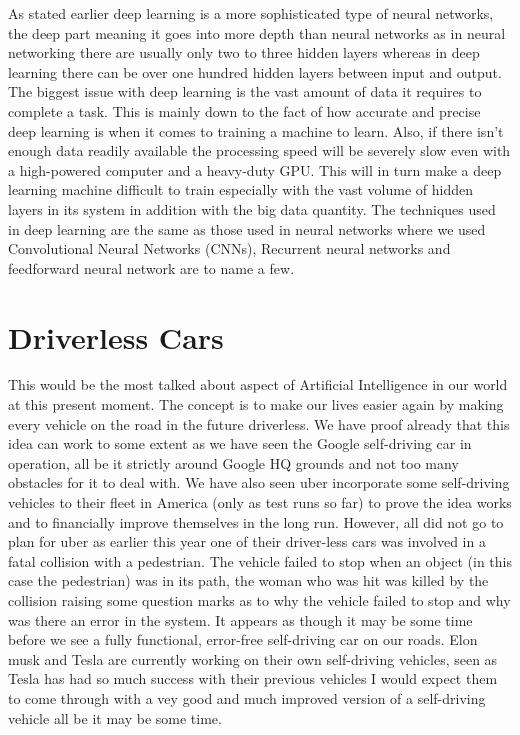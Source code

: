 \documentclass[letterpaper, 10 pt, conference]{ieeeconf}  %
\begin{document}
As stated earlier deep learning is a more sophisticated type of neural networks, the deep part meaning it goes into more depth than neural networks as in neural networking there are usually only two to three hidden layers whereas in deep learning there can be over one hundred hidden layers between input and output. 
The biggest issue with deep learning is the vast amount of data it requires to complete a task. This is mainly down to the fact of how accurate and precise deep learning is when it comes to training a machine to learn. Also, if there isn’t enough data readily available the processing speed will be severely slow even with a high-powered computer and a heavy-duty GPU. This will in turn make a deep learning machine difficult to train especially with the vast volume of hidden layers in its system in addition with the big data quantity. The techniques used in deep learning are the same as those used in neural networks where we used Convolutional Neural Networks (CNNs), Recurrent neural networks and feedforward neural network are to name a few. 


\section{Driverless Cars}
This would be the most talked about aspect of Artificial Intelligence in our world at this present moment. The concept is to make our lives easier again by making every vehicle on the road in the future driverless. We have proof already that this idea can work to some extent as we have seen the Google self-driving car in operation, all be it strictly around Google HQ grounds and not too many obstacles for it to deal with. We have also seen uber incorporate some self-driving vehicles to their fleet in America (only as test runs so far) to prove the idea works and to financially improve themselves in the long run. However, all did not go to plan for uber as earlier this year one of their driver-less cars was involved in a fatal collision with a pedestrian. The vehicle failed to stop when an object (in this case the pedestrian) was in its path, the woman who was hit was killed by the collision raising some question marks as to why the vehicle failed to stop and why was there an error in the system. It appears as though it may be some time before we see a fully functional, error-free self-driving car on our roads. Elon musk and Tesla are currently working on their own self-driving vehicles, seen as Tesla has had so much success with their previous vehicles I would expect them to come through with a vey good and much improved version of a self-driving vehicle all be it may be some time. 
\end{document}
